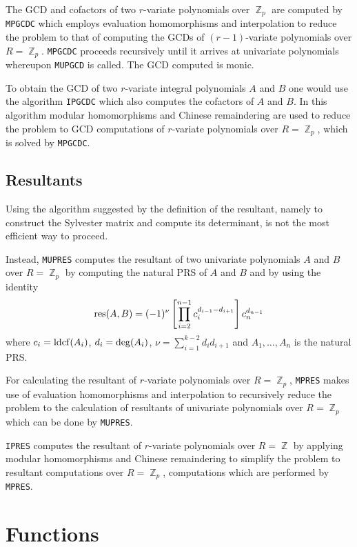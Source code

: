 The GCD and cofactors of two $r$-variate polynomials over $\BbbZ_p$
are computed by {\tt MPGCDC} which employs evaluation homomorphisms
and interpolation to reduce the problem to that of computing the GCDs
of $(r-1)$-variate polynomials over $R = \BbbZ_p$. {\tt MPGCDC}
proceeds recursively until it arrives at univariate polynomials
whereupon {\tt MUPGCD} is called. The GCD computed is monic.

To obtain the GCD of two $r$-variate integral polynomials $A$ and $B$
one would use the algorithm {\tt IPGCDC} which also computes the
cofactors of $A$ and $B$. In this algorithm modular homomorphisms and
Chinese remaindering are used to reduce the problem to GCD
computations of $r$-variate polynomials over $R = \BbbZ_p$, which is
solved by {\tt MPGCDC}.

\subsection{Resultants}
Using the algorithm suggested by the definition of the resultant,
namely to construct the Sylvester matrix and compute its determinant,
is not the most efficient way to proceed.

Instead, {\tt MUPRES} computes the resultant of two univariate
polynomials $A$ and $B$ over $R= \BbbZ_p$ by computing the natural PRS
of $A$ and $B$ and by using the identity
% 
$${\rm res}(A,B) = (-1)^\nu \left[
\prod_{i=2}^{n-1}c_i^{d_{i-1}-d_{i+1}}\right]c_n^{d_{n-1}}$$
%
where $c_i = {\rm ldcf}(A_i)$, $d_i = {\rm deg}(A_i)$, $\nu =
\sum_{i=1}^{k-2}d_id_{i+1}$ and $A_1,\ldots,A_n$ is the natural PRS.

For calculating the resultant of $r$-variate polynomials over $R =
\BbbZ_p$, {\tt MPRES} makes use of evaluation homomorphisms and
interpolation to recursively reduce the problem to the calculation of
resultants of univariate polynomials over $R = \BbbZ_p$ which can be
done by {\tt MUPRES}.

{\tt IPRES} computes the resultant of $r$-variate polynomials over $R
= \BbbZ$ by applying modular homomorphisms and Chinese remaindering to
simplify the problem to resultant computations over $R = \BbbZ_p$,
computations which are performed by {\tt MPRES}.

\section{Functions}

